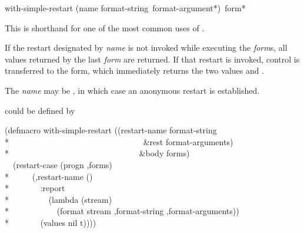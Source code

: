 \begin{defmac}
with-simple-restart (name format-string {\,format-argument}*)
                    {\,form}*

  This is shorthand for one of the most common uses of .

  If the restart designated by \emph{name} is not invoked while executing the \emph{form\/}s,
  all values returned by the last \emph{form} are returned. If that
  restart is invoked, control is transferred to the 
  form, which immediately returns the two values  and .

  The \emph{name} may be , in which case an anonymous restart
  is established.

   could be defined by
\begin{lisp}
(defmacro with-simple-restart ((restart-name format-string \\*
~~~~~~~~~~~~~~~~~~~~~~~~~~~~~~~~\&rest format-arguments) \\*
~~~~~~~~~~~~~~~~~~~~~~~~~~~~~~~\&body forms) \\
~~{\Xbq}(restart-case (progn ,{\Xatsign}forms) \\*
~~~~~(,restart-name () \\*
~~~~~~~:report \\*
~~~~~~~~~(lambda (stream) \\*
~~~~~~~~~~~(format stream ,format-string ,{\Xatsign}format-arguments)) \\*
~~~~~~~(values nil t))))
\end{lisp}


\end{defmac}
